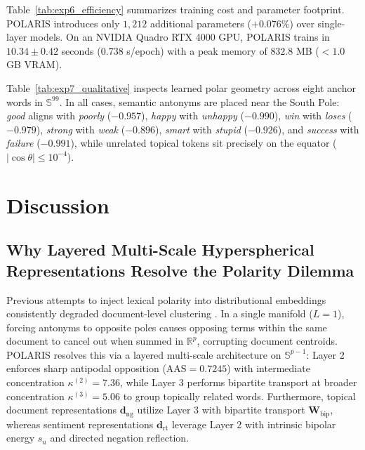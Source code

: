 \documentclass[journal]{IEEEtran}
\begin{document}
Table~\ref{tab:exp6_efficiency} summarizes training cost and parameter footprint. POLARIS introduces only $1,212$ additional parameters ($+0.076\%$) over single-layer models. On an NVIDIA Quadro RTX 4000 GPU, POLARIS trains in $10.34 \pm 0.42$ seconds ($0.738$ s/epoch) with a peak memory of $832.8$ MB ($< 1.0$ GB VRAM).

Table~\ref{tab:exp7_qualitative} inspects learned polar geometry across eight anchor words in $\mathbb{S}^{99}$. In all cases, semantic antonyms are placed near the South Pole: \textit{good} aligns with \textit{poorly} ($-0.957$), \textit{happy} with \textit{unhappy} ($-0.990$), \textit{win} with \textit{loses} ($-0.979$), \textit{strong} with \textit{weak} ($-0.896$), \textit{smart} with \textit{stupid} ($-0.926$), and \textit{success} with \textit{failure} ($-0.991$), while unrelated topical tokens sit precisely on the equator ($|\cos\theta| \le 10^{-4}$).

\section{Discussion}

\subsection{Why Layered Multi-Scale Hyperspherical Representations Resolve the Polarity Dilemma}
Previous attempts to inject lexical polarity into distributional embeddings consistently degraded document-level clustering \cite{mrksic2017semantic}. In a single manifold ($L=1$), forcing antonyms to opposite poles causes opposing terms within the same document to cancel out when summed in $\mathbb{R}^p$, corrupting document centroids. POLARIS resolves this via a layered multi-scale architecture on $\mathbb{S}^{p-1}$: Layer 2 enforces sharp antipodal opposition ($\text{AAS} = 0.7245$) with intermediate concentration $\kappa^{(2)} = 7.36$, while Layer 3 performs bipartite transport at broader concentration $\kappa^{(3)} = 5.06$ to group topically related words. Furthermore, topical document representations $\mathbf{d}_{\text{ng}}$ utilize Layer 3 with bipartite transport $\mathbf{W}_{\text{bip}}$, whereas sentiment representations $\mathbf{d}_{\text{rt}}$ leverage Layer 2 with intrinsic bipolar energy $s_u$ and directed negation reflection.
\end{document}
